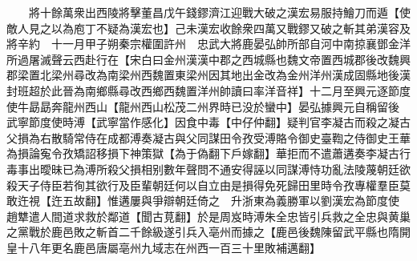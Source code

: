 　　將十餘萬衆出西陵將擊董昌戊午錢鏐濟江迎戰大破之漢宏易服持鱠刀而遁【使敵人見之以為庖丁不疑為漢宏也】己未漢宏收餘衆四萬又戰鏐又破之斬其弟漢容及將辛約　十一月甲子朔秦宗權圍許州　忠武大將鹿晏弘帥所部自河中南掠襄鄧金洋所過屠滅聲云西赴行在【宋白曰金州漢漢中郡之西城縣也魏文帝置西城郡後改魏興郡梁置北梁州尋改為南梁州西魏置東梁州因其地出金改為金州洋州漢成固縣地後漢封班超於此晉為南鄉縣尋改西鄉西魏置洋州帥讀曰率洋音祥】十二月至興元逐節度使牛勗勗奔龍州西山【龍州西山松茂二州界時已没於蠻中】晏弘據興元自稱留後　武寧節度使時溥【武寧當作感化】因食中毒【中仔仲翻】疑判官李凝古而殺之凝古父損為右散騎常侍在成都溥奏凝古與父同謀田令孜受溥賂令御史臺鞫之侍御史王華為損論寃令孜矯詔移損下神策獄【為于偽翻下戶嫁翻】華拒而不遣蕭遘奏李凝古行毒事出曖昧已為溥所殺父損相别數年聲問不通安得誣以同謀溥恃功亂法陵蔑朝廷欲殺天子侍臣若徇其欲行及臣輩朝廷何以自立由是損得免死歸田里時令孜專權羣臣莫敢迕視【迕五故翻】惟遘屢與爭辯朝廷倚之　升浙東為義勝軍以劉漢宏為節度使　趙犨遣人間道求救於鄰道【聞古莧翻】於是周岌時溥朱全忠皆引兵救之全忠與黄巢之黨戰於鹿邑敗之斬首二千餘級遂引兵入亳州而據之【鹿邑後魏陳留武平縣也隋開皇十八年更名鹿邑唐屬亳州九域志在州西一百三十里敗補邁翻】

